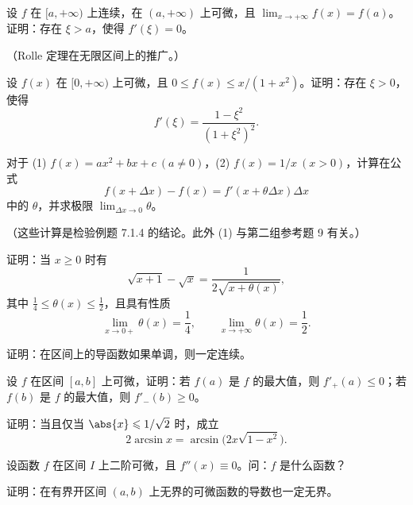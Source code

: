 \begin{xexercise}[6]
设 $f$ 在 $[a,+\infty)$ 上连续，在 $(a,+\infty)$ 上可微，且 $\lim_{x\to+\infty}f(x)=f(a)$。证明：存在 $\xi>a$，使得 $f'(\xi)=0$。

（Rolle 定理在无限区间上的推广。）
\end{xexercise}

\begin{xexercise}[7]
设 $f(x)$ 在 $[0,+\infty)$ 上可微，且 $0\leqslant f(x)\leqslant x/(1+x^2)$。证明：存在 $\xi>0$，使得
\[
  f'(\xi)=\frac{1-\xi^2}{(1+\xi^2)^2}.
\]
\end{xexercise}

\begin{xexercise}[8]
对于 (1) $f(x)=ax^2+bx+c\ (a\neq0)$，(2) $f(x)=1/x\ (x>0)$，计算在公式
\[
  f(x+\Delta x)-f(x)=f'(x+\theta\Delta x)\Delta x
\]
中的 $\theta$，并求极限 $\lim_{\Delta x\to0}\theta$。

（这些计算是检验例题 7.1.4 的结论。此外 (1) 与第二组参考题 9 有关。）
\end{xexercise}

\begin{xexercise}[9]
证明：当 $x\geqslant0$ 时有
\[
  \sqrt{x+1}-\sqrt{x}=\frac{1}{2\sqrt{x+\theta(x)}},
\]
其中 $\frac14\leqslant\theta(x)\leqslant\frac12$，且具有性质
\[
  \lim_{x\to0+}\theta(x)=\frac14,
  \qquad
  \lim_{x\to+\infty}\theta(x)=\frac12.
\]
\end{xexercise}

\begin{xexercise}[10]
证明：在区间上的导函数如果单调，则一定连续。
\end{xexercise}

\begin{xexercise}[11]
设 $f$ 在区间 $[a,b]$ 上可微，证明：若 $f(a)$ 是 $f$ 的最大值，则 $f'_+(a)\leqslant0$；若 $f(b)$ 是 $f$ 的最大值，则 $f'_-(b)\geqslant0$。
\end{xexercise}

\begin{xexercise}[12]
证明：当且仅当 $\abs{x}\leqslant1/\sqrt2$ 时，成立
\[
  2\arcsin x=\arcsin\bigl(2x\sqrt{1-x^2}\bigr).
\]
\end{xexercise}

\begin{xexercise}[13]
设函数 $f$ 在区间 $I$ 上二阶可微，且 $f''(x)\equiv0$。问：$f$ 是什么函数？
\end{xexercise}

\begin{xexercise}[14]
证明：在有界开区间 $(a,b)$ 上无界的可微函数的导数也一定无界。
\end{xexercise}

